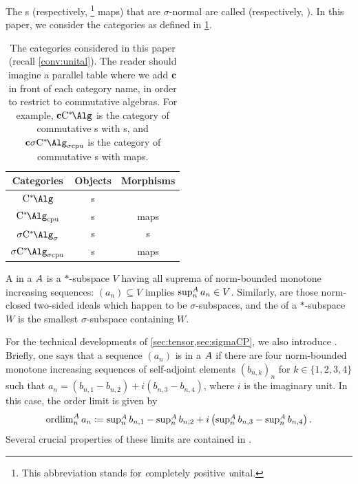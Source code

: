 The \starhom{}s (respectively, \cpu{}\footnote{This abbreviation stands for \emph{c}ompletely
\emph{p}ositive \emph{u}nital.} maps) that are $\sigma$-normal are called  (respectively, ).
In this paper, we consider the categories as defined in \cref{tab:categories}.
\begin{table}[ht]
	\begin{tabular}{ccc}
		\textbf{Categories} & Objects    & Morphisms    \\
		\toprule
		$\Calg$             & \cstar{}s  & \starhom{}   \\\midrule
		$\Calgcpu$          & \cstar{}s  & \cpu{} maps  \\\midrule
		$\SigmaC$           & \cstars{}s & \starshom{}s \\\midrule
		$\SigmaCcpu$        & \cstars{}s & \scpu{} maps\\ \bottomrule
	\end{tabular}
	\caption{The categories considered in this paper (recall \cref{conv:unital}). The reader should imagine a parallel table where we add $\mathbf{c}$ in front of each category name, in order to restrict to commutative algebras. For example, $\cCalg$ is the category of commutative \cstar{}s with \starhom{}s, and $\cSigmaCcpu$ is the category of commutative \cstars{}s with \scpu{} maps.}\label{tab:categories}
\end{table}

A  in a \cstars{} ${A}$ is a $*$-subspace $V$ having all suprema of norm-bounded monotone increasing sequences: $(a_n)\subseteq V$ implies $\sup_n^{{A}}a_n \in V$. %
Similarly,  are those norm-closed two-sided ideals which happen to be $\sigma$-subspaces, and the  of a $*$-subspace $W$ is the smallest $\sigma$-subspace containing $W$.

For the technical developments of \cref{sec:tensor,sec:sigmaCP}, we also introduce .
Briefly, one says that a sequence $(a_n)$ is  in a \cstars{} ${A}$ if there are four norm-bounded monotone increasing sequences of self-adjoint elements $(b_{n,k})_n$ for $k\in\lbrace 1,2,3,4\rbrace$ such that $a_n=(b_{n,1} - b_{n,2})+i(b_{n,3}-b_{n,4})$, where $i$ is the imaginary unit.
In this case, the order limit is given by
\[\textstyle
	\operatorname{ordlim}_n^{{A}} a_n \coloneqq \sup_n^{{A}} b_{n,1} - \sup_n^{{A}} b_{n,2} + i \left(\sup_n^{{A}} b_{n,3} - \sup_n^{{A}} b_{n,4}\right).
\]
Several crucial properties of these limits are contained in \cite[Section 2.1]{saito15monotone}.

